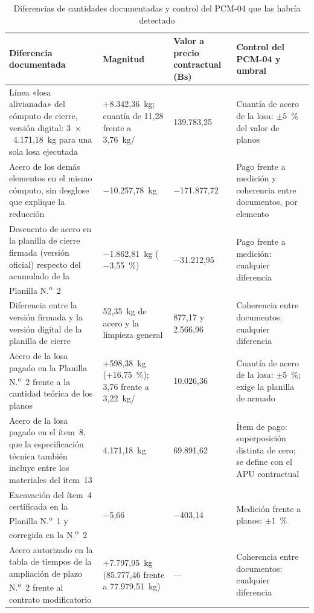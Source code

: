 \begin{table}[H]
\caption{Diferencias de cantidades documentadas y control del PCM-04 que las habría detectado}
\label{tab:conciliacion-magnitud}
\setlength{\tabcolsep}{4pt}
\begin{tabularx}{\linewidth}{@{}LP{3.3cm}P{2.2cm}P{3.5cm}@{}}
\toprule
\textbf{Diferencia documentada} & \textbf{Magnitud} & \textbf{Valor a precio contractual (Bs)} & \textbf{Control del PCM-04 y umbral} \\
\midrule
Línea «losa alivianada» del cómputo de cierre, versión digital: 3~$\times$~4.171,18~kg para una sola losa ejecutada & +8.342,36~kg; cuantía de 11,28 frente a 3,76~kg/\mdos{} & 139.783,25 & Cuantía de acero de la losa: $\pm 5$~\% del valor de planos \\
\addlinespace
Acero de los demás elementos en el mismo cómputo, sin desglose que explique la reducción & $-$10.257,78~kg & $-$171.877,72 & Pago frente a medición y coherencia entre documentos, por elemento \\
\addlinespace
Descuento de acero en la planilla de cierre firmada (versión oficial) respecto del acumulado de la Planilla N.\textsuperscript{o}~2 & $-$1.862,81~kg ($-$3,55~\%) & $-$31.212,95 & Pago frente a medición: cualquier diferencia \\
\addlinespace
Diferencia entre la versión firmada y la versión digital de la planilla de cierre & 52,35~kg de acero y la limpieza general & 877,17 y 2.566,96 & Coherencia entre documentos: cualquier diferencia \\
\addlinespace
Acero de la losa pagado en la Planilla N.\textsuperscript{o}~2 frente a la cantidad teórica de los planos & +598,38~kg (+16,75~\%); 3,76 frente a 3,22~kg/\mdos{} & 10.026,36 & Cuantía de acero de la losa: $\pm 5$~\%; exige la planilla de armado \\
\addlinespace
Acero de la losa pagado en el ítem~8, que la especificación técnica también incluye entre los materiales del ítem~13 & 4.171,18~kg & 69.891,62 & Ítem de pago: superposición distinta de cero; se define con el APU contractual \\
\addlinespace
Excavación del ítem~4 certificada en la Planilla N.\textsuperscript{o}~1 y corregida en la N.\textsuperscript{o}~2 & $-$5,66~\mtres{} & $-$403,14 & Medición frente a planos: $\pm 1$~\% \\
\addlinespace
Acero autorizado en la tabla de tiempos de la ampliación de plazo N.\textsuperscript{o}~2 frente al contrato modificatorio & +7.797,95~kg (85.777,46 frente a 77.979,51~kg) & --- & Coherencia entre documentos: cualquier diferencia \\

\end{tabularx}
\end{table}

